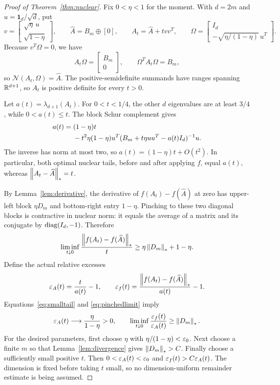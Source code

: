\documentclass[11pt]{article}
\begin{document}
\begin{proof}[Proof of Theorem~\ref{thm:nuclear}]
Fix $0<\eta<1$ for the moment. With $d=2m$ and $u=\boldsymbol1_d/\sqrt d$, put
\[
 v=\begin{bmatrix}\sqrt\eta\,u\\\sqrt{1-\eta}\end{bmatrix},\qquad
 \widehat A=B_m\oplus[0],\qquad
 A_t=\widehat A+tvv^T,
 \qquad
 \Omega=\begin{bmatrix}I_d\\-\sqrt{\eta/(1-\eta)}\,u^T\end{bmatrix}.
\]
Because $v^T\Omega=0$, we have
\[
 A_t\Omega=\begin{bmatrix}B_m\\0\end{bmatrix},\qquad
 \Omega^TA_t\Omega=B_m,
\]
so $\mathcal N(A_t,\Omega)=\widehat A$. The positive-semidefinite summands have ranges spanning $\mathbb R^{d+1}$, so $A_t$ is positive definite for every $t>0$.

Let $a(t)=\lambda_{d+1}(A_t)$. For $0<t<1/4$, the other $d$ eigenvalues are at least $3/4$, while $0<a(t)\le t$. The block Schur complement gives
\begin{align}\label{eq:smalltail}
 a(t)={}&(1-\eta)t\\
 &-t^2\eta(1-\eta)
 u^T(B_m+t\eta uu^T-a(t)I_d)^{-1}u.\notag
\end{align}
The inverse has norm at most two, so $a(t)=(1-\eta)t+O(t^2)$. In particular, both optimal nuclear tails, before and after applying $f$, equal $a(t)$, whereas $\left\lVert A_t-\widehat A\right\rVert_*=t$.

By Lemma~\ref{lem:derivative}, the derivative of $f(A_t)-f(\widehat A)$ at zero has upper-left block $\eta D_m$ and bottom-right entry $1-\eta$. Pinching to these two diagonal blocks is contractive in nuclear norm: it equals the average of a matrix and its conjugate by $\operatorname{diag}(I_d,-1)$. Therefore
\begin{equation}\label{eq:pinchedlimit}
 \liminf_{t\downarrow0}
 \frac{\left\lVert f(A_t)-f(\widehat A)\right\rVert_*}{t}
 \ge\eta\left\lVert D_m\right\rVert_*+1-\eta.
\end{equation}
Define the actual relative excesses
\[
 \varepsilon_A(t)=\frac{t}{a(t)}-1,\qquad
 \varepsilon_f(t)=\frac{\left\lVert f(A_t)-f(\widehat A)\right\rVert_*}{a(t)}-1.
\]
Equations~\eqref{eq:smalltail} and \eqref{eq:pinchedlimit} imply
\[
 \varepsilon_A(t)\longrightarrow\frac\eta{1-\eta}>0,
 \qquad
 \liminf_{t\downarrow0}\frac{\varepsilon_f(t)}{\varepsilon_A(t)}
 \ge\left\lVert D_m\right\rVert_*.
\]
For the desired parameters, first choose $\eta$ with $\eta/(1-\eta)<\varepsilon_0$. Next choose a finite $m$ so that Lemma~\ref{lem:divergence} gives $\left\lVert D_m\right\rVert_*>C$. Finally choose a sufficiently small positive $t$. Then $0<\varepsilon_A(t)<\varepsilon_0$ and $\varepsilon_f(t)>C\varepsilon_A(t)$. The dimension is fixed before taking $t$ small, so no dimension-uniform remainder estimate is being assumed.
\end{proof}
\end{document}

